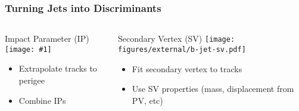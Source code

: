 \documentclass[usenames,dvipsnames]{beamer}
\newcommand{\widegraphic}[1]{\texttt{[image: \#1]}}
\begin{document}
\begin{frame}
  \frametitle{Turning Jets into Discriminants}
  \begin{columns}[t]
    \begin{column}{0.5\textwidth}
      \begin{center}
        Impact Parameter (IP)
      \widegraphic{figures/external/b-jet-ip.pdf}
      \end{center}
      \begin{itemize}
      \item Extrapolate tracks to perigee
      \item Combine IPs
      \end{itemize}
    \end{column}
    \vline{}
    \begin{column}{0.5\textwidth}
      \begin{center}
        Secondary Vertex (SV)
      \texttt{[image: figures/external/b-jet-sv.pdf]}
        \end{center}
      \begin{itemize}
      \item Fit secondary vertex to tracks
      \item Use SV properties (mass, displacement from PV, etc)
      \end{itemize}
    \end{column}
  \end{columns}
\end{frame}
\end{document}
